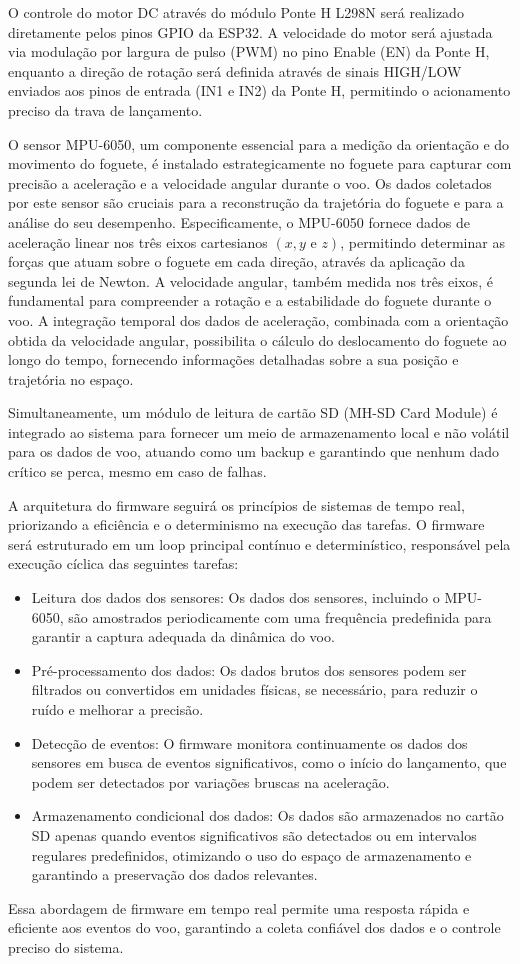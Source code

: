 O controle do motor DC através do módulo Ponte H L298N será realizado diretamente pelos pinos GPIO da ESP32. A velocidade do motor será ajustada via modulação por largura de pulso (PWM) no pino Enable (EN) da Ponte H, enquanto a direção de rotação será definida através de sinais HIGH/LOW enviados aos pinos de entrada (IN1 e IN2) da Ponte H, permitindo o acionamento preciso da trava de lançamento.

O sensor MPU-6050, um componente essencial para a medição da orientação e do movimento do foguete, é instalado estrategicamente no foguete para capturar com precisão a aceleração e a velocidade angular durante o voo. Os dados coletados por este sensor são cruciais para a reconstrução da trajetória do foguete e para a análise do seu desempenho. Especificamente, o MPU-6050 fornece dados de aceleração linear nos três eixos cartesianos $(x,y \text{ e } z)$, permitindo determinar as forças que atuam sobre o foguete em cada direção, através da aplicação da segunda lei de Newton. A velocidade angular, também medida nos três eixos, é fundamental para compreender a rotação e a estabilidade do foguete durante o voo. A integração temporal dos dados de aceleração, combinada com a orientação obtida da velocidade angular, possibilita o cálculo do deslocamento do foguete ao longo do tempo, fornecendo informações detalhadas sobre a sua posição e trajetória no espaço.

Simultaneamente, um módulo de leitura de cartão SD (MH-SD Card Module) é integrado ao sistema para fornecer um meio de armazenamento local e não volátil para os dados de voo, atuando como um backup e garantindo que nenhum dado crítico se perca, mesmo em caso de falhas.

A arquitetura do firmware seguirá os princípios de sistemas de tempo real, priorizando a eficiência e o determinismo na execução das tarefas. O firmware será estruturado em um loop principal contínuo e determinístico, responsável pela execução cíclica das seguintes tarefas:
\begin{itemize}
    \item Leitura dos dados dos sensores: Os dados dos sensores, incluindo o MPU-6050, são amostrados periodicamente com uma frequência predefinida para garantir a captura adequada da dinâmica do voo.
    \item Pré-processamento dos dados: Os dados brutos dos sensores podem ser filtrados ou convertidos em unidades físicas, se necessário, para reduzir o ruído e melhorar a precisão.
    \item Detecção de eventos: O firmware monitora continuamente os dados dos sensores em busca de eventos significativos, como o início do lançamento, que podem ser detectados por variações bruscas na aceleração.
    \item Armazenamento condicional dos dados: Os dados são armazenados no cartão SD apenas quando eventos significativos são detectados ou em intervalos regulares predefinidos, otimizando o uso do espaço de armazenamento e garantindo a preservação dos dados relevantes.
\end{itemize}
Essa abordagem de firmware em tempo real permite uma resposta rápida e eficiente aos eventos do voo, garantindo a coleta confiável dos dados e o controle preciso do sistema.

